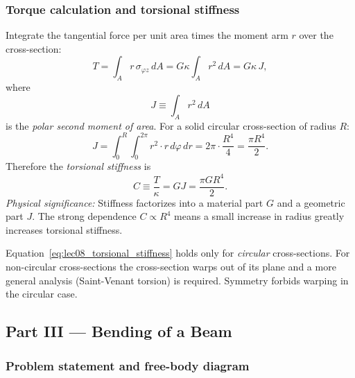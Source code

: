 \documentclass[../main.tex]{subfiles}
\begin{document}
\subsubsection*{Torque calculation and torsional stiffness}

Integrate the tangential force per unit area times the moment arm $r$ over the cross-section:
\begin{equation}
    T = \int_A r\,\sigma_{\varphi z}\,dA
    = G\kappa \int_A r^2\,dA
    = G\kappa\,J,
    \label{eq:lec08_torque_integral}
\end{equation}
where
\begin{equation}
    J \equiv \int_A r^2\,dA
    \label{eq:lec08_polar_moment_def}
\end{equation}
is the \emph{polar second moment of area}. For a solid circular cross-section of radius $R$:
\begin{equation}
    J = \int_0^R \int_0^{2\pi} r^2 \cdot r\,d\varphi\,dr
    = 2\pi \cdot \frac{R^4}{4}
    = \frac{\pi R^4}{2}.
    \label{eq:lec08_polar_moment_circle}
\end{equation}
Therefore the \emph{torsional stiffness} is
\begin{equation}
    \boxed{C \equiv \frac{T}{\kappa} = GJ = \frac{\pi G R^4}{2}.}
    \label{eq:lec08_torsional_stiffness}
\end{equation}
\textit{Physical significance:} Stiffness factorizes into a material part $G$ and a geometric part $J$. The strong dependence $C \propto R^4$ means a small increase in radius greatly increases torsional stiffness.

\begin{remark}
Equation~\eqref{eq:lec08_torsional_stiffness} holds only for \emph{circular} cross-sections. For non-circular cross-sections the cross-section warps out of its plane and a more general analysis (Saint-Venant torsion) is required. Symmetry forbids warping in the circular case.
\end{remark}

\subsection*{Part III — Bending of a Beam}

\subsubsection*{Problem statement and free-body diagram}
\end{document}

